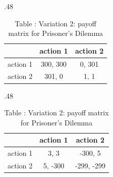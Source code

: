 \begin{table}[htb]%
\centering
\setlength{\tabcolsep}{10pt}
    \begin{subtable}[t]{.48\textwidth}
        \centering
        \captionsetup{labelformat=empty}
            \begin{tabular}{l|cc}
                 & action 1 & action 2 \\
                \toprule
                action 1 & 300, 300 & 0, 301  \\
                action 2 & 301, 0\phantom{00} & 1, 1\phantom{01}  \\
            \end{tabular}
        \caption{Table \thetable {}: Variation 1: payoff matrix for Prisoner's Dilemma}
    \end{subtable}%
    \hfill
   \begin{subtable}[t]{.48\textwidth}
        \centering
        \captionsetup{labelformat=empty}
        \begin{tabular}{l|cc}
                 & action 1 & action 2 \\
                \toprule
                action 1 & 3, \phantom{-}3\phantom{00} & -300, \phantom{-}5\phantom{00} \\
                action 2 & 5, -300 & -299, -299  \\
            \end{tabular}
        \caption{Table \thetable {}: Variation 2: payoff matrix for Prisoner's Dilemma}
    \end{subtable}
\end{table}

